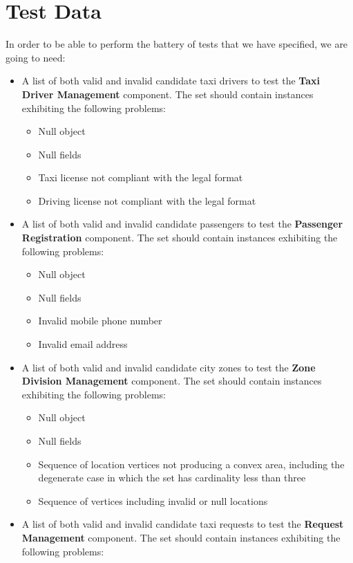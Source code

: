 \section{Test Data}
In order to be able to perform the battery of tests that we have specified, we are going to need:
\begin{itemize}
	\item A list of both valid and invalid candidate taxi drivers to test the \textbf{Taxi Driver Management} component. The set should contain instances exhibiting the following problems: 
		\begin{itemize}
		\item Null object
		\item Null fields
		\item Taxi license not compliant with the legal format
		\item Driving license not compliant with the legal format 
		\end{itemize}
	\item A list of both valid and invalid candidate passengers to test the \textbf{Passenger Registration} component. The set should contain instances exhibiting the following problems: 
	\begin{itemize}
		\item Null object
		\item Null fields
		\item Invalid mobile phone number
		\item Invalid email address
		\end{itemize}
	\item A list of both valid and invalid candidate city zones to test the \textbf{Zone Division Management} component. The set should contain instances exhibiting the following problems: 
	\begin{itemize}
		\item Null object
		\item Null fields
		\item Sequence of location vertices not producing a convex area, including the degenerate case in which the set has cardinality less than three
		\item Sequence of vertices including invalid or null locations
		\end{itemize}
	\item A list of both valid and invalid candidate taxi requests to test the \textbf{Request Management} component. The set should contain instances exhibiting the following problems: 
		\begin{itemize}

\end{itemize}
\end{itemize}
